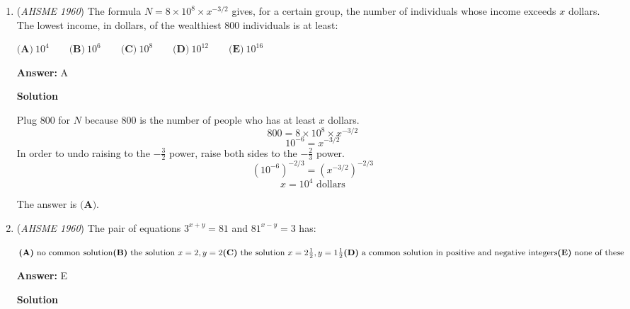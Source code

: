 \begin{enumerate}
 \textbf{Answer: }C



\textbf{Solution}

Since $25<69<125$, divide $69$ by $25$.  The quotient is $2$ and the remainder is $19$, so rewrite the number as
 \[69 = 2 \cdot 25 + 19\]Similarly, dividing $19$ by $5$ results in quotient of $3$ and remainder of $4$, so rewrite the number as
 \[69 = 2 \cdot 25 + 3 \cdot 5 + 4 \cdot 1\]Thus, the number in base $5$ can be written as $234_5$, so the answer is $\boxed{\textbf{(C)}}$



	\item (\textit{AHSME 1960}) The formula $N=8 \times 10^{8} \times x^{-3/2}$ gives, for a certain group, the number of individuals whose income exceeds $x$ dollars. 
The lowest income, in dollars, of the wealthiest $800$ individuals is at least:


 $\textbf{(A)}\ 10^4\qquad \textbf{(B)}\ 10^6\qquad \textbf{(C)}\ 10^8\qquad \textbf{(D)}\ 10^{12} \qquad \textbf{(E)}\ 10^{16}$

 \textbf{Answer: }A



\textbf{Solution}

Plug $800$ for $N$ because $800$ is the number of people who has at least $x$ dollars.
 \[800 = 8 \times 10^{8} \times x^{-3/2}\]
 \[10^{-6} = x^{-3/2}\]In order to undo raising to the $-\frac{3}{2}$ power, raise both sides to the $-\frac{2}{3}$ power.
 \[(10^{-6})^{-2/3} = (x^{-3/2})^{-2/3}\]
 \[x = 10^4  \text{ dollars}\]

 The answer is $\boxed{\textbf{(A)}}$.

 


	\item (\textit{AHSME 1960}) The pair of equations $3^{x+y}=81$ and $81^{x-y}=3$ has:


 $\textbf{(A)}\ \text{no common solution} \qquad \\ \textbf{(B)}\ \text{the solution} \text{ } x=2, y=2\qquad \\ \textbf{(C)}\ \text{the solution} \text{ } x=2\frac{1}{2}, y=1\frac{1}{2} \qquad \\ \textbf{(D)}\text{ a common solution in positive and negative integers} \qquad \\ \textbf{(E)}\ \text{none of these}$

 \textbf{Answer: }E



\textbf{Solution}


\end{enumerate}
